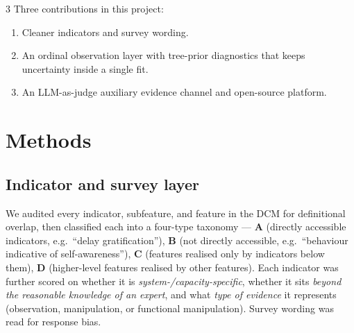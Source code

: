 \documentclass[a0,portrait]{a0poster}
\begin{document}
\begin{multicols}{3}
Three contributions in this project:
\begin{enumerate}
    \item Cleaner indicators and survey wording.
    \item An ordinal observation layer with tree-prior diagnostics that keeps uncertainty inside a single fit.
    \item An LLM-as-judge auxiliary evidence channel and open-source platform.
\end{enumerate}


\section*{\color{PosterGreen} Methods}

\subsection*{\color{PosterAccent} Indicator and survey layer}
We audited every indicator, subfeature, and feature in the DCM for definitional overlap, then classified each into a four-type taxonomy --- \textbf{A} (directly accessible indicators, e.g.\ ``delay gratification''), \textbf{B} (not directly accessible, e.g.\ ``behaviour indicative of self-awareness''), \textbf{C} (features realised only by indicators below them), \textbf{D} (higher-level features realised by other features). Each indicator was further scored on whether it is \emph{system-/capacity-specific}, whether it sits \emph{beyond the reasonable knowledge of an expert}, and what \emph{type of evidence} it represents (observation, manipulation, or functional manipulation). Survey wording was read for response bias.


\end{multicols}
\end{document}
